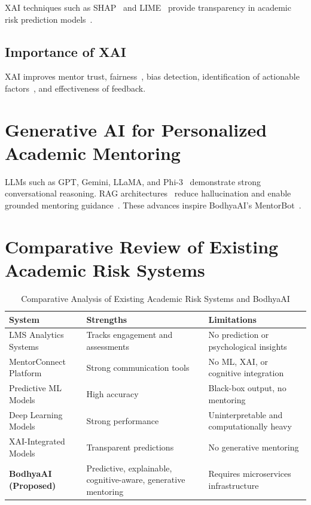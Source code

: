 \documentclass[12pt,a4paper]{report}
\begin{document}
XAI techniques such as SHAP~\cite{lundberg2017shap} and LIME~\cite{ribeiro2016lime} provide transparency in academic risk prediction models~\cite{williams2025shaplimeedu}.

\subsection{Importance of XAI}

XAI improves mentor trust, fairness~\cite{zhang2025fairaied}, bias detection, identification of actionable factors~\cite{altukhi2025xaiedu}, and effectiveness of feedback.


\section{Generative AI for Personalized Academic Mentoring}

LLMs such as GPT, Gemini, LLaMA, and Phi-3~\cite{abdin2024phi3} demonstrate strong conversational reasoning. RAG architectures~\cite{gao2023rag,awsrag2025} reduce hallucination and enable grounded mentoring guidance~\cite{wong2024ragtutors}. These advances inspire BodhyaAI’s MentorBot~\cite{scarlatos2025llmtutors}.


\section{Comparative Review of Existing Academic Risk Systems}

\begin{table}[H]
\centering
\caption{Comparative Analysis of Existing Academic Risk Systems and BodhyaAI}
\label{tab:system_comparison}
\begin{tabular}{|p{4cm}|p{5cm}|p{5cm}|}
\hline
\textbf{System} & \textbf{Strengths} & \textbf{Limitations} \\
\hline
LMS Analytics Systems & Tracks engagement and assessments & No prediction or psychological insights \\
\hline
MentorConnect Platform & Strong communication tools & No ML, XAI, or cognitive integration \\
\hline
Predictive ML Models & High accuracy & Black-box output, no mentoring \\
\hline
Deep Learning Models & Strong performance & Uninterpretable and computationally heavy \\
\hline
XAI-Integrated Models & Transparent predictions & No generative mentoring \\
\hline
\textbf{BodhyaAI (Proposed)} & Predictive, explainable, cognitive-aware, generative mentoring & Requires microservices infrastructure \\
\hline
\end{tabular}
\end{table}
\end{document}
